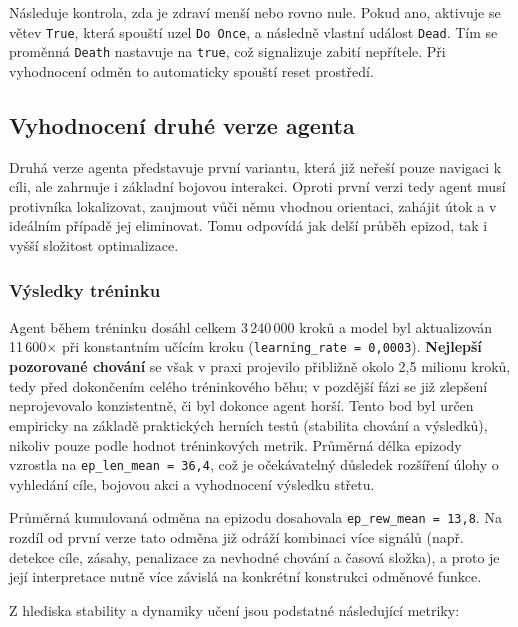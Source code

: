 Následuje kontrola, zda je zdraví menší nebo rovno nule. Pokud ano, aktivuje se větev \texttt{True}, která spouští uzel \texttt{Do Once}, a následně vlastní událost \texttt{Dead}. Tím se proměnná \texttt{Death} nastavuje na \texttt{true}, což signalizuje zabití nepřítele. Při vyhodnocení odměn to automaticky spouští reset prostředí.

\newpage

\subsection{Vyhodnocení druhé verze agenta}

Druhá verze agenta představuje první variantu, která již neřeší pouze navigaci k cíli, ale zahrnuje i základní bojovou interakci. Oproti první verzi tedy agent musí protivníka lokalizovat, zaujmout vůči němu vhodnou orientaci, zahájit útok a v ideálním případě jej eliminovat. Tomu odpovídá jak delší průběh epizod, tak i vyšší složitost optimalizace.

\subsubsection{Výsledky tréninku}

Agent během tréninku dosáhl celkem 3\,240\,000 kroků a model byl aktualizován 11\,600$\times$ při konstantním učícím kroku (\texttt{learning\_rate = 0{,}0003}). \textbf{Nejlepší pozorované chování} se však v praxi projevilo přibližně okolo 2{,}5 milionu kroků, tedy před dokončením celého tréninkového běhu; v pozdější fázi se již zlepšení neprojevovalo konzistentně, či byl dokonce agent horší. Tento bod byl určen empiricky na základě praktických herních testů (stabilita chování a výsledků), nikoliv pouze podle hodnot tréninkových metrik. Průměrná délka epizody vzrostla na \texttt{ep\_len\_mean = 36{,}4}, což je očekávatelný důsledek rozšíření úlohy o vyhledání cíle, bojovou akci a vyhodnocení výsledku střetu.

Průměrná kumulovaná odměna na epizodu dosahovala \texttt{ep\_rew\_mean = 13{,}8}. Na rozdíl od první verze tato odměna již odráží kombinaci více signálů (např. detekce cíle, zásahy, penalizace za nevhodné chování a časová složka), a proto je její interpretace nutně více závislá na konkrétní konstrukci odměnové funkce.

Z hlediska stability a dynamiky učení jsou podstatné následující metriky:

